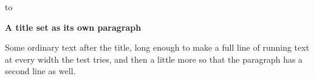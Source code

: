 \documentclass{article}
\begin{document}
\null\vskip21pt
{\parindent0pt\hbox to \textwidth{{\small\hfill}\par}}
\removelastskip\vskip20pt\nointerlineskip
{\LARGE\bfseries\noindent A title set as its own paragraph\par}
\vskip 20pt
Some ordinary text after the title, long enough to make a full line of
running text at every width the test tries, and then a little more so that
the paragraph has a second line as well.
\end{document}
